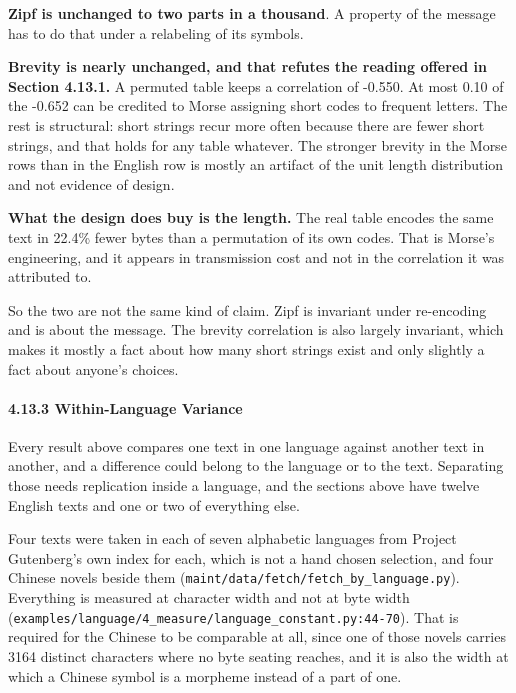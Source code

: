 \textbf{Zipf is unchanged to two parts in a thousand}. A property of the message has to do that under a relabeling of its symbols.

\textbf{Brevity is nearly unchanged, and that refutes the reading offered in Section 4.13.1.} A permuted table keeps a correlation of -0.550. At most 0.10 of the -0.652 can be credited to Morse assigning short codes to frequent letters. The rest is structural: short strings recur more often because there are fewer short strings, and that holds for any table whatever. The stronger brevity in the Morse rows than in the English row is mostly an artifact of the unit length distribution and not evidence of design.

\textbf{What the design does buy is the length.} The real table encodes the same text in 22.4\% fewer bytes than a permutation of its own codes. That is Morse's engineering, and it appears in transmission cost and not in the correlation it was attributed to.

So the two are not the same kind of claim. Zipf is invariant under re-encoding and is about the message. The brevity correlation is also largely invariant, which makes it mostly a fact about how many short strings exist and only slightly a fact about anyone's choices.

\paragraph{4.13.3 Within-Language Variance}

Every result above compares one text in one language against another text in another, and a difference could belong to the language or to the text. Separating those needs replication inside a language, and the sections above have twelve English texts and one or two of everything else.

Four texts were taken in each of seven alphabetic languages from Project Gutenberg's own index for each, which is not a hand chosen selection, and four Chinese novels beside them (\texttt{maint/\allowbreak{}data/\allowbreak{}fetch/\allowbreak{}fetch\_\allowbreak{}by\_\allowbreak{}language.\allowbreak{}py}). Everything is measured at character width and not at byte width (\texttt{examples/\allowbreak{}language/\allowbreak{}4\_\allowbreak{}measure/\allowbreak{}language\_\allowbreak{}constant.\allowbreak{}py:44-\allowbreak{}70}). That is required for the Chinese to be comparable at all, since one of those novels carries 3164 distinct characters where no byte seating reaches, and it is also the width at which a Chinese symbol is a morpheme instead of a part of one.

